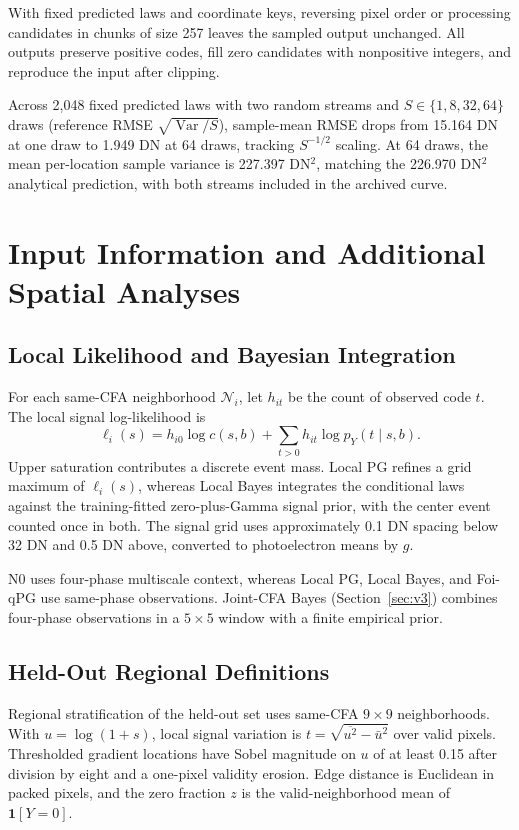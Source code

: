 \documentclass[10pt,twocolumn,journal]{IEEEtran}
\begin{document}
With fixed predicted laws and coordinate keys, reversing pixel order or processing candidates in chunks of size 257 leaves the sampled output unchanged. All outputs preserve positive codes, fill zero candidates with nonpositive integers, and reproduce the input after clipping.

Across 2,048 fixed predicted laws with two random streams and $S\in\{1,8,32,64\}$ draws (reference RMSE $\sqrt{\operatorname{Var}/S}$), sample-mean RMSE drops from 15.164 DN at one draw to 1.949 DN at 64 draws, tracking $S^{-1/2}$ scaling. At 64 draws, the mean per-location sample variance is 227.397 DN$^2$, matching the 226.970 DN$^2$ analytical prediction, with both streams included in the archived curve.

\section{Input Information and Additional Spatial Analyses}
\subsection{Local Likelihood and Bayesian Integration}
For each same-CFA neighborhood $\mathcal N_i$, let $h_{it}$ be the count of observed code $t$. The local signal log-likelihood is
\begin{equation}
\ell_i(s)=h_{i0}\log c(s,b)+\sum_{t>0}h_{it}\log p_Y(t\mid s,b).
\end{equation}
Upper saturation contributes a discrete event mass. Local PG refines a grid maximum of $\ell_i(s)$, whereas Local Bayes integrates the conditional laws against the training-fitted zero-plus-Gamma signal prior, with the center event counted once in both. The signal grid uses approximately 0.1 DN spacing below 32 DN and 0.5 DN above, converted to photoelectron means by $g$.

N0 uses four-phase multiscale context, whereas Local PG, Local Bayes, and Foi-qPG use same-phase observations. Joint-CFA Bayes (Section~\ref{sec:v3}) combines four-phase observations in a $5\times5$ window with a finite empirical prior.

\subsection{Held-Out Regional Definitions}\label{sec:regionaldefinitions}
Regional stratification of the held-out set uses same-CFA $9\times9$ neighborhoods. With $u=\log(1+s)$, local signal variation is $t=\sqrt{\overline{u^2}-\bar u^2}$ over valid pixels. Thresholded gradient locations have Sobel magnitude on $u$ of at least 0.15 after division by eight and a one-pixel validity erosion. Edge distance is Euclidean in packed pixels, and the zero fraction $z$ is the valid-neighborhood mean of $\mathbf1[Y=0]$.
\end{document}
